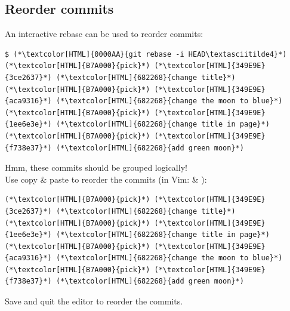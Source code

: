 \subsection{Reorder commits}
\begin{frame}[fragile]
  \subslidetitle
  An interactive rebase can be used to reorder commits:
  \begin{lstlisting}
$ (*\textcolor[HTML]{0000AA}{git rebase -i HEAD\textasciitilde4}*)
(*\textcolor[HTML]{B7A000}{pick}*) (*\textcolor[HTML]{349E9E}{3ce2637}*) (*\textcolor[HTML]{682268}{change title}*)
(*\textcolor[HTML]{B7A000}{pick}*) (*\textcolor[HTML]{349E9E}{aca9316}*) (*\textcolor[HTML]{682268}{change the moon to blue}*)
(*\textcolor[HTML]{B7A000}{pick}*) (*\textcolor[HTML]{349E9E}{1ee6e3e}*) (*\textcolor[HTML]{682268}{change title in page}*)
(*\textcolor[HTML]{B7A000}{pick}*) (*\textcolor[HTML]{349E9E}{f738e37}*) (*\textcolor[HTML]{682268}{add green moon}*)
\end{lstlisting}
  Hmm, these commits should be grouped logically!\\

  \vspace{1em}
  Use copy \& paste to reorder the commits (in Vim:  \& ):
  \begin{lstlisting}
(*\textcolor[HTML]{B7A000}{pick}*) (*\textcolor[HTML]{349E9E}{3ce2637}*) (*\textcolor[HTML]{682268}{change title}*)
(*\textcolor[HTML]{B7A000}{pick}*) (*\textcolor[HTML]{349E9E}{1ee6e3e}*) (*\textcolor[HTML]{682268}{change title in page}*)
(*\textcolor[HTML]{B7A000}{pick}*) (*\textcolor[HTML]{349E9E}{aca9316}*) (*\textcolor[HTML]{682268}{change the moon to blue}*)
(*\textcolor[HTML]{B7A000}{pick}*) (*\textcolor[HTML]{349E9E}{f738e37}*) (*\textcolor[HTML]{682268}{add green moon}*)
\end{lstlisting}
  Save and quit the editor to reorder the commits.
\end{frame}


